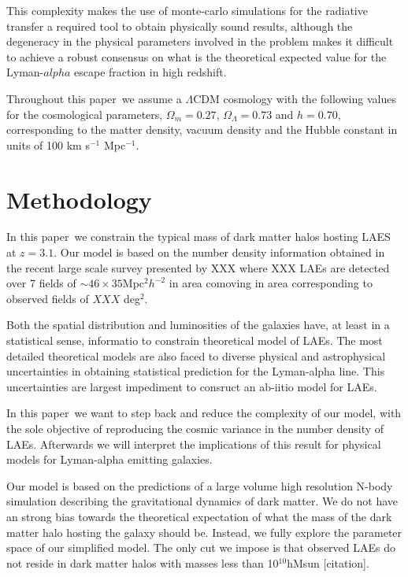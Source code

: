 \documentclass[usenatbib]{mn2e}
\newcommand{\documentname}{paper~}
\begin{document}
This complexity makes the use of monte-carlo simulations for the
radiative transfer a required tool to obtain physically sound results,
although the degeneracy in the physical parameters involved in the
problem makes it difficult to achieve a robust consensus on what is
the theoretical expected value for the Lyman-$alpha$ escape fraction
in high redshift. 


Throughout this \documentname we assume a $\Lambda$CDM cosmology with the
following values for the cosmological parameters, $\Omega_{m}=0.27$,
$\Omega_{\Lambda}=0.73$ and $h=0.70$, corresponding to the matter
density, vacuum density and the Hubble constant in units of 100 km
s$^{-1}$ Mpc$^{-1}$. 

\section{Methodology}
In this \documentname we constrain the typical mass of dark matter halos
hosting LAES at $z=3.1$. Our model is based on the number density
information obtained in the recent large scale survey presented by XXX
where XXX LAEs are detected over 7 fields of $\sim 46 \times
35$Mpc$^{2}h^{-2}$ in area comoving in area corresponding to observed
fields of $XXX$ deg$^{2}$.  

Both the spatial distribution and luminosities of the galaxies have,
at least in a statistical sense, informatio to constrain theoretical
model of LAEs. The most detailed theoretical models are also faced to
diverse physical and astrophysical uncertainties in obtaining
statistical prediction for the Lyman-alpha line. This uncertainties
are largest impediment to consruct an ab-iitio model for LAEs.  

In this \documentname we want to step back and reduce the complexity of our
model, with the sole objective of reproducing the cosmic variance in
the number density of LAEs. Afterwards we will interpret the
implications of this result for physical models for Lyman-alpha
emitting galaxies. 

Our model is based on the predictions of a large volume high
resolution N-body simulation describing the gravitational dynamics of
dark matter. We do not have an strong bias towards the theoretical
expectation of what the mass of the dark matter halo hosting the
galaxy should be.  Instead, we fully explore the parameter space of
our simplified model. The only cut we impose is that observed LAEs do
not reside in dark matter halos with masses less than 10$^{10}$hMsun
[citation].  
\end{document}
